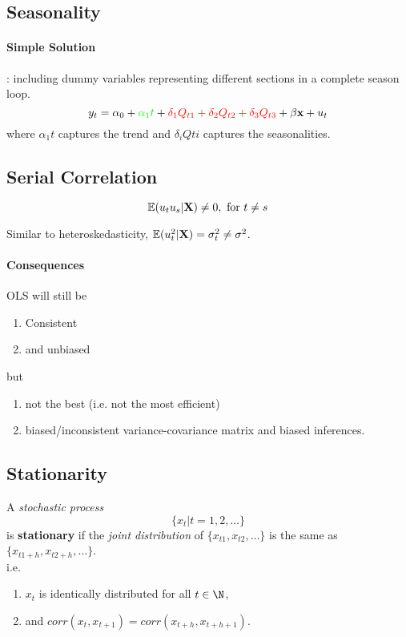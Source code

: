 \documentclass[]{article}
\begin{document}
		\subsection{Seasonality}
			\paragraph{Simple Solution}: including dummy variables representing different sections in a complete season loop.
			\[
				y_t = \alpha_0 + \textcolor{green}{\alpha_1 t} + \textcolor{red}{\delta_1 Q_{t1} + \delta_2 Q_{t2} + \delta_3 Q_{t3}} + \beta \textbf{x} + u_t
			\]
			where $\alpha_1 t$ captures the trend and $\delta_i Q{ti}$ captures the seasonalities.
		
		\subsection{Serial Correlation}
			\begin{definition}
				\[
					\mathbb{E}({u_t u_s | \textbf{X}}) \neq 0, \text{{ for }} t \neq s
				\]
			\end{definition}
			\begin{remark}
				Similar to heteroskedasticity, $\mathbb{E}({u_t^2 | \textbf{X}}) = \sigma_t^2 \neq \sigma^2$.
			\end{remark}
			\paragraph{Consequences} OLS will still be
				\begin{enumerate}
					\item Consistent
					\item and unbiased
				\end{enumerate}
				but
				\begin{enumerate}
					\item not the best (i.e. not the most efficient)
					\item biased/inconsistent variance-covariance matrix and biased inferences.
				\end{enumerate}
		\subsection{Stationarity}
			\begin{definition}
				A \emph{stochastic process} 
				\[
					\{x_t | t = 1, 2, \dots \}
				\]
				is \textbf{stationary} if the \emph{joint distribution} of $\{x_{t1}, x_{t2}, \dots\}$ is the same as $\{x_{t1+h}, x_{t2+h}, \dots\}$. \\
				i.e. \begin{enumerate}
					\item $x_t$ is identically distributed for all $t \in \N$,
					\item and $corr(x_t, x_{t+1}) = corr(x_{t+h}, x_{t+h+1})$.
				\end{enumerate}
			\end{definition}
		
\end{document}
